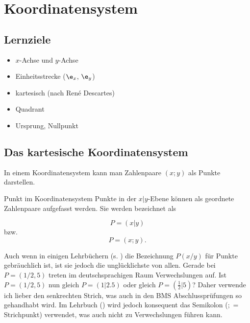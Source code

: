
\section{Koordinatensystem}
\subsection*{Lernziele}

\begin{itemize}
\item $x$-Achse und $y$-Achse
\item Einheitsstrecke ($\e_x$, $\e_y$)
\item kartesisch (nach René Descartes)
\item Quadrant 
\item Ursprung, Nullpunkt
\end{itemize}

\newpage

\subsection{Das kartesische Koordinatensystem}
In einem Koordinatensystem kann man Zahlenpaare $(x; y)$ als Punkte
darstellen.

\begin{definition}{Punkt im Koordinatensystem}{}
  Punkte in der $x|y$-Ebene können als geordnete Zahlenpaare aufgefasst
  werden. Sie werden bezeichnet als

  $$P=(x|y)$$
  bzw.
  $$P=(x;y).$$

\end{definition}


\begin{bemerkung}{}{}
  Auch wenn in einigen Lehrbüchern  (s. \cite{frommenwiler17alg}) die Bezeichnung $P(x/y)$ für Punkte gebräuchlich ist, ist
  sie jedoch die unglücklichste von allen. Gerade bei $P=(1/2,5)$
  treten im deutschsprachigen Raum Verwechslungen auf. Ist $P=(1/2,5)$
  nun gleich $P=(1 | 2.5)$ oder gleich $P=(\frac{1}{2} | 5)$?
  Daher verwende ich lieber den senkrechten Strich, was auch in den
  BMS Abschlussprüfungen so gehandhabt wird. Im Lehrbuch (\cite{marthaler21alg}) wird jedoch
  konsequent das Semikolon ($;$ = Strichpunkt) verwendet, was auch
  nicht zu Verwechslungen führen kann.
\end{bemerkung}
\newpage

